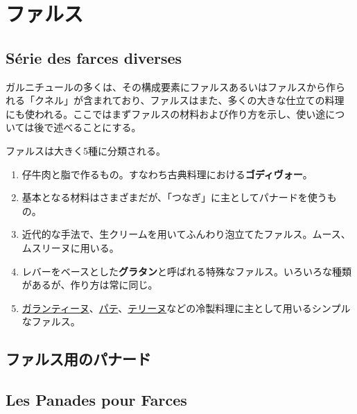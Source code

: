 \hypertarget{ux30d5ux30a1ux30ebux30b9}{%
\section{ファルス}\label{ux30d5ux30a1ux30ebux30b9}}

\hypertarget{suxe9rie-des-farces-diverses}{%
\subsection{Série des farces
diverses}\label{suxe9rie-des-farces-diverses}}

ガルニチュールの多くは、その構成要素にファルスあるいはファルスから作ら
れる「クネル」が含まれており、ファルスはまた、多くの大きな仕立ての料理
にも使われる。ここではまずファルスの材料および作り方を示し、使い途につ
いては後で述べることにする。

ファルスは大きく5種に分類される。

\begin{enumerate}
\def\labelenumi{\arabic{enumi}.}
\item
  仔牛肉と脂で作るもの。すなわち古典料理における\textbf{ゴディヴォー}。
\item
  基本となる材料はさまざまだが、「つなぎ」に主としてパナードを使うもの。
\item
  近代的な手法で、生クリームを用いてふんわり泡立てたファルス。ムース、ムスリーヌに用いる。
\item
  レバーをベースとした\textbf{グラタン}と呼ばれる特殊なファルス。いろいろな種類があるが、作り方は常に同じ。
\item
  \protect\hyperlink{}{ガランティーヌ}、\protect\hyperlink{}{パテ}、\protect\hyperlink{}{テリーヌ}などの冷製料理に主として用いるシンプルなファルス。
\end{enumerate}

\hypertarget{ux30d5ux30a1ux30ebux30b9ux7528ux306eux30d1ux30caux30fcux30c9}{%
\subsection{ファルス用のパナード}\label{ux30d5ux30a1ux30ebux30b9ux7528ux306eux30d1ux30caux30fcux30c9}}

\vspace*{-1.7\zw}

\hypertarget{les-panades-pour-farces}{%
\subsection{Les Panades pour Farces}\label{les-panades-pour-farces}}
